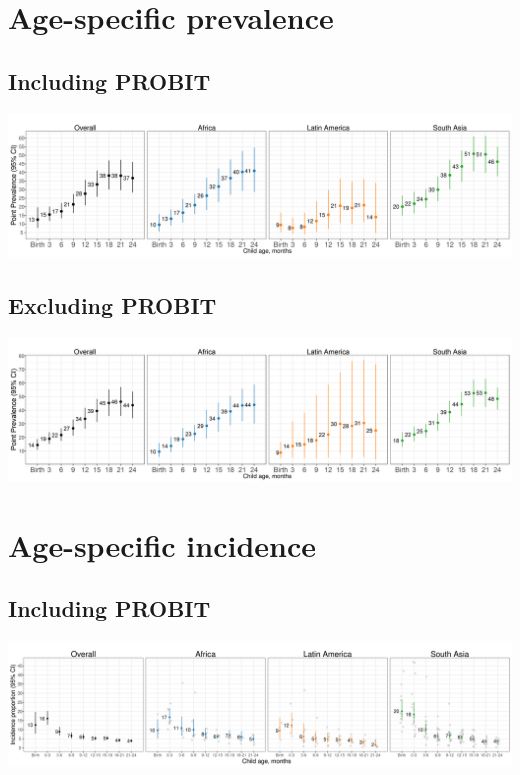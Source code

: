 \documentclass[
  9pt,
]{book}
\begin{document}
\hypertarget{age-specific-prevalence-1}{%
\section{Age-specific prevalence}\label{age-specific-prevalence-1}}

\hypertarget{including-probit-1}{%
\subsection{Including PROBIT}\label{including-probit-1}}

\includegraphics[width=58.33in]{figures//stunting/fig-stunt-2-prev-overall_region--allage-primary}

\hypertarget{excluding-probit-1}{%
\subsection{Excluding PROBIT}\label{excluding-probit-1}}

\includegraphics[width=58.33in]{figures//stunting/fig-stunt-2-prev-overall_region--allage-primary_no_probit}

\hypertarget{age-specific-incidence-1}{%
\section{Age-specific incidence}\label{age-specific-incidence-1}}

\hypertarget{including-probit-2}{%
\subsection{Including PROBIT}\label{including-probit-2}}

\includegraphics[width=66.67in]{figures//stunting/fig-stunt-2-inc-overall_region--allage-primary}
\end{document}
